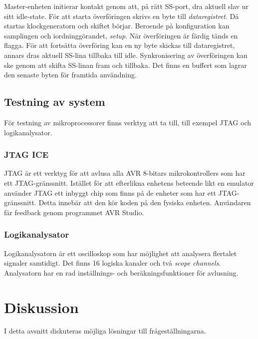 \documentclass[11pt]{article}
\begin{document}
\begin{flushleft}
Master-enheten initierar kontakt genom att, på rätt SS-port, dra aktuell slav ur sitt idle-state. För att starta överföringen skrivs en byte till \textit{dataregistret}. Då startas klockgeneratorn och skiftet börjar. Beroende på konfiguration kan samplingen och iordninggörandet, \textit{setup}. När överföringen är färdig tänds en flagga. För att fortsätta överföring kan en ny byte skickas till dataregistret, annars dras aktuell SS-lina tillbaka till idle. Synkronisering av överföringen kan ske genom att skifta SS-linan fram och tillbaka. Det finns en buffert som lagrar den senaste byten för framtida användning.\cite{ATMega16}

\subsection{Testning av system} 

För testning av mikroprocessorer finns verktyg att ta till, till exempel JTAG och logikanalysator.

\subsubsection{JTAG ICE}

JTAG är ett verktyg för att avlusa alla AVR 8-bitars mikrokontrollers som har ett JTAG-gränssnitt. Istället för att efterlikna enhetens beteende likt en emulator använder JTAG ett inbyggt chip som finns på de enheter som har ett JTAG-gränssnitt. Detta innebär att den kör koden på den fysiska enheten. Användaren får feedback genom programmet AVR Studio. \cite{guideJTAG}

\subsubsection{Logikanalysator}

Logikanalysatorn är ett oscilloskop som har möjlighet att analysera flertalet signaler samtidigt. Det finns 16  logiska kanaler och  två \textit{scope channels}. Analysatorn har en rad inställnings- och beräkningsfunktioner för avlusning. \cite{guideLogic}

\pagebreak

\section{Diskussion}
I detta avsnitt diskuteras möjliga lösningar till frågeställningarna.


\end{flushleft}
\end{document}

